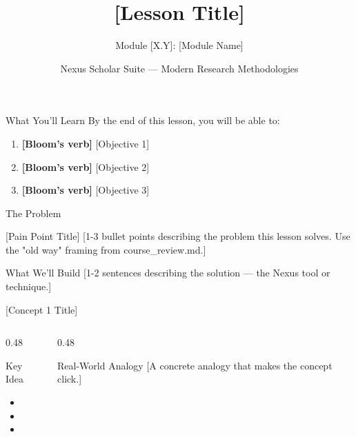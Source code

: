 \documentclass[aspectratio=169]{beamer}
\title{[Lesson Title]}
\subtitle{Module [X.Y]: [Module Name]}
\author{Nexus Scholar Suite — Modern Research Methodologies}
\date{}
\begin{document}
\begin{frame}[plain]
  \titlepage
\end{frame}

\begin{frame}{What You'll Learn}
  By the end of this lesson, you will be able to:
  \begin{enumerate}
    \item \textbf{[Bloom's verb]} [Objective 1]
    \item \textbf{[Bloom's verb]} [Objective 2]
    \item \textbf{[Bloom's verb]} [Objective 3]
  \end{enumerate}
\end{frame}

\begin{frame}{The Problem}
  \begin{alertblock}{[Pain Point Title]}
    [1-3 bullet points describing the problem this lesson solves.
     Use the "old way" framing from course_review.md.]
  \end{alertblock}
  \vspace{0.3cm}
  \begin{block}{What We'll Build}
    [1-2 sentences describing the solution — the Nexus tool or technique.]
  \end{block}
\end{frame}

\begin{frame}{[Concept 1 Title]}
  \begin{columns}[T]
    \begin{column}{0.48\textwidth}
      \begin{block}{Key Idea}
        \begin{itemize}
          \item [Point 1]
          \item [Point 2]
          \item [Point 3]
        \end{itemize}
      \end{block}
    \end{column}
    \begin{column}{0.48\textwidth}
      \begin{exampleblock}{Real-World Analogy}
        [A concrete analogy that makes the concept click.]
      \end{exampleblock}
    \end{column}
  \end{columns}
\end{frame}
\end{document}
